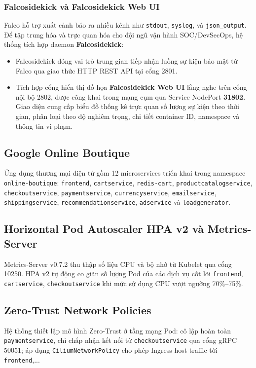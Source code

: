 \subsubsection{Falcosidekick và Falcosidekick Web UI}
Falco hỗ trợ xuất cảnh báo ra nhiều kênh như \texttt{stdout}, \texttt{syslog}, và \texttt{json\_output}. Để tập trung hóa và trực quan hóa cho đội ngũ vận hành SOC/DevSecOps, hệ thống tích hợp daemon \textbf{Falcosidekick}:
\begin{itemize}
    \item Falcosidekick đóng vai trò trung gian tiếp nhận luồng sự kiện bảo mật từ Falco qua giao thức HTTP REST API tại cổng 2801.
    \item Tích hợp cổng hiển thị đồ họa \textbf{Falcosidekick Web UI} lắng nghe trên cổng nội bộ 2802, được công khai trong mạng cụm qua Service NodePort \textbf{31802}. Giao diện cung cấp biểu đồ thống kê trực quan số lượng sự kiện theo thời gian, phân loại theo độ nghiêm trọng, chi tiết container ID, namespace và thông tin vi phạm.
\end{itemize}

\subsection{Google Online Boutique}
Ứng dụng thương mại điện tử gồm 12 microservices triển khai trong namespace \texttt{online-boutique}: \texttt{frontend}, \texttt{cartservice}, \texttt{redis-cart}, \texttt{productcatalogservice}, \texttt{checkoutservice}, \texttt{paymentservice}, \texttt{currencyservice}, \texttt{emailservice}, \texttt{shippingservice}, \texttt{recommendationservice}, \texttt{adservice} và \texttt{loadgenerator}.

\subsection{Horizontal Pod Autoscaler HPA v2 và Metrics-Server}
Metrics-Server v0.7.2 thu thập số liệu CPU và bộ nhớ từ Kubelet qua cổng 10250. HPA v2 tự động co giãn số lượng Pod của các dịch vụ cốt lõi \texttt{frontend}, \texttt{cartservice}, \texttt{checkoutservice} khi mức sử dụng CPU vượt ngưỡng 70\%--75\%.

\subsection{Zero-Trust Network Policies}
Hệ thống thiết lập mô hình Zero-Trust ở tầng mạng Pod: cô lập hoàn toàn \texttt{paymentservice}, chỉ chấp nhận kết nối từ \texttt{checkoutservice} qua cổng gRPC 50051; áp dụng \texttt{CiliumNetworkPolicy} cho phép Ingress host traffic tới \texttt{frontend},...
